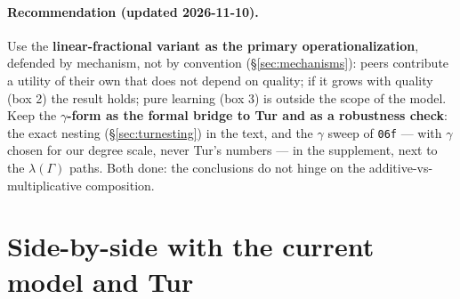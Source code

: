 \documentclass[11pt,a4paper]{article}
\newcommand{\code}[1]{\texttt{#1}}
\begin{document}
\paragraph{Recommendation (updated 2026-11-10).} Use the \textbf{linear-fractional
variant as the primary operationalization}, defended by mechanism, not by convention
(\S\ref{sec:mechanisms}): peers contribute a utility of their own that does not depend on
quality; if it grows with quality (box 2) the result holds; pure learning (box 3) is outside
the scope of the model. Keep the \textbf{$\gamma$-form as the formal bridge to Tur and as a
robustness check}: the exact nesting (\S\ref{sec:turnesting}) in the text, and the
$\gamma$ sweep of \code{06f} --- with $\gamma$ chosen for our degree scale, never Tur's
numbers --- in the supplement, next to the $\lambda(\Gamma)$ paths. Both done: the
conclusions do not hinge on the additive-vs-multiplicative composition.

\section{Side-by-side with the current model and Tur}
\end{document}
